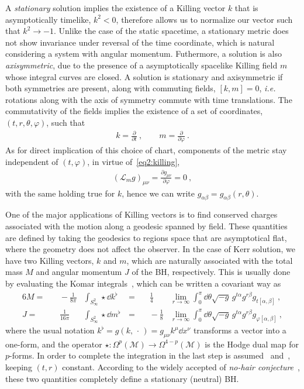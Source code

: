 A \emph{stationary} solution implies the existence of a Killing vector $k$ that is asymptotically timelike, $k^2<0$, therefore allows us to normalize our vector such that $k^2 \rightarrow -1$. 
Unlike the case of the static spacetime, a stationary metric does not show invariance under reversal of the time coordinate, which is natural considering a system with angular momentum. 
Futhermore, a solution is also \emph{axisymmetric}, due to the presence of a asymptotically spacelike Killing field $m$ whose integral curves are closed.
A solution is stationary and axisymmetric if both symmetries are present, along with commuting fields, $[k , m] = 0$, \emph{i.e.} rotations along with the axis of symmetry commute with time translations. The commutativity of the fields implies the existence of a set of coordinates, $(t,r,\theta,\varphi)$, such that
\begin{align}
    k = \frac{\partial}{\partial t} ~, \qquad m = \frac{\partial}{\partial \varphi} ~.
    \label{eq2:tPhiKilling}
\end{align}
As for direct implication of this choice of chart, components of the metric stay independent of $(t,\varphi)$, in virtue of~\eqref{eq2:killing},
\begin{align}
    (\mathcal{L}_m g)_{\mu\nu} = \frac{\partial g_{\mu\nu}}{\partial \varphi} = 0 ~,
    \label{eq2:lieMetricTPhi}
\end{align}
with the same holding true for $k$, hence we can write $g_{\alpha\beta} = g_{\alpha\beta}(r,\theta)$. 

One of the major applications of Killing vectors is to find conserved charges associated with the motion along a geodesic spanned by field.
These quantities are defined by taking the geodesics to regions space that are asymptotical flat, where the geometry does not affect the observer.
In the case of Kerr solution, we have two Killing vectors, $k$ and $m$, which are naturally associated with the total mass $M$ and angular momentum $J$ of the BH, respectively.
This is usually done by evaluating the Komar integrals~\cite{Heusler1996, Wald2010}, which can be written a covariant way as
\begin{alignat}{6}
    M = &&\, -\frac{1}{8 \pi} & \int_{S^2_\infty} \star \dd k^\flat \,& = &&\, \frac{1}{4} & \lim_{r\to\infty}  \int_0^\pi \dd\theta \sqrt{-g} \, g^{t\alpha} g^{r\beta} g_{t[\alpha,\beta]} ~, \label{eq2:komarMass} \\
    J = &&\, \frac{1}{16 \pi} & \int_{S^2_\infty} \star \dd m^\flat \,& = &&\, - \frac{1}{8} & \lim_{r\to\infty}  \int_0^\pi \dd\theta \sqrt{-g} \, g^{t\alpha} g^{r\beta} g_{\varphi[\alpha,\beta]} ~, \label{eq2:komarSpin}
\end{alignat}
where the usual notation $k^\flat = g(k, \,\cdot\,) = g_{\mu\nu} k^\mu \dd x^\nu$ transforms a vector into a one-form, and the operator $\star : \Omega^{p}(\mathcal{M})\to\Omega^{4-p}(\mathcal{M})$ is the Hodge dual map for $p$-forms.
In order to complete the integration in the last step is assumed~ and~, keeping $(t,r)$ constant. 
According to the widely accepted of \emph{no-hair conjecture}~\cite{Carter1971}, these two quantities completely define a stationary (neutral) BH. 

